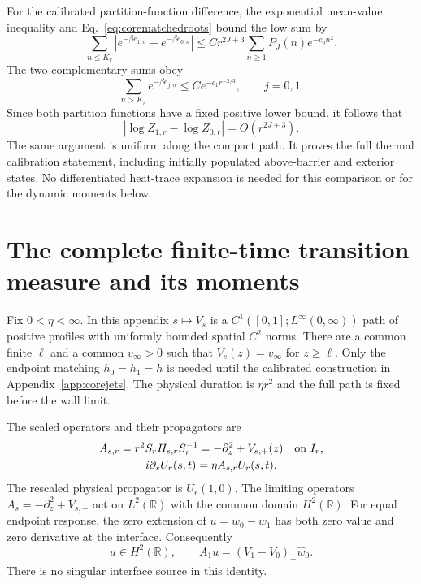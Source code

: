 \documentclass[aps,pra,reprint,superscriptaddress,longbibliography]{revtex4-2}
\newcommand{\R}{\mathbb R}
\begin{document}
For the calibrated partition-function difference, the exponential
mean-value inequality and Eq.~\eqref{eq:corematchedroots} bound the low
sum by
\begin{equation}
 \sum_{n\le K_r}
 |e^{-\beta e_{1,n}}-e^{-\beta e_{0,n}}|
 \le Cr^{2J+3}\sum_{n\ge1}P_J(n)e^{-c_0n^2}.
 \label{eq:corelowpartition}
\end{equation}
The two complementary sums obey
\begin{equation}
 \sum_{n>K_r}e^{-\beta e_{j,n}}
     \le Ce^{-c_1r^{-2/3}},\qquad j=0,1.
 \label{eq:corehightail}
\end{equation}
Since both partition functions have a fixed positive lower bound, it
follows that
\begin{equation}
 |\log Z_{1,r}-\log Z_{0,r}|=O(r^{2J+3}).
 \label{eq:corematchedpartition}
\end{equation}
The same argument is uniform along the compact path. It proves the
full thermal calibration statement, including initially populated
above-barrier and exterior states. No differentiated heat-trace expansion
is needed for this comparison or for the dynamic moments below.

\section{The complete finite-time transition measure and its moments}
\label{app:corefinitework}

Fix $0<\eta<\infty$. In this appendix $s\mapsto V_s$ is a
$C^1([0,1];L^\infty(0,\infty))$ path of positive profiles with uniformly
bounded spatial $C^2$ norms. There are a common finite $\ell$ and a common
$v_\infty>0$ such that $V_s(z)=v_\infty$ for $z\ge\ell$.
Only the endpoint matching $h_0=h_1=h$ is needed until the calibrated
construction in Appendix~\ref{app:corejets}. The physical duration is
$\eta r^2$ and the full path is fixed before the wall limit.

The scaled operators and their propagators are
\begin{equation}
 \begin{gathered}
 A_{s,r}=r^2S_rH_{s,r}S_r^{-1}
          =-\partial_z^2+V_{s,+}(z)\quad\hbox{on }I_r,\\
 i\partial_sU_r(s,t)=\eta A_{s,r}U_r(s,t).
 \end{gathered}
 \label{eq:coreintervaldynamics}
\end{equation}
The rescaled physical propagator is $U_r(1,0)$. The limiting operators
$A_s=-\partial_z^2+V_{s,+}$ act on $L^2(\R)$ with the common domain
$H^2(\R)$. For equal endpoint response, the zero extension of
$u=w_0-w_1$ has both zero value and zero derivative at the interface.
Consequently
\begin{equation}
 u\in H^2(\R),\qquad A_1u=(V_1-V_0)_+\widehat w_0.
 \label{eq:coreinterfacecancellation}
\end{equation}
There is no singular interface source in this identity.
\end{document}
